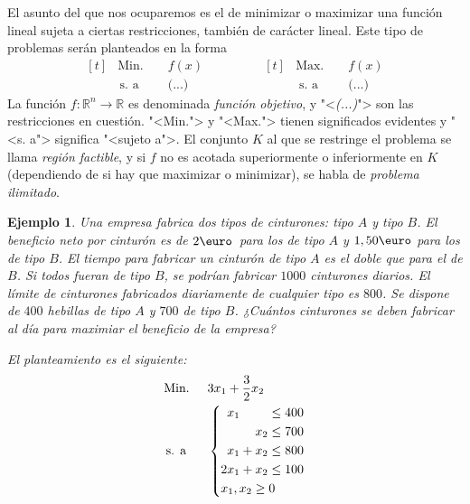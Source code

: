 \documentclass[11pt]{report}
\theoremstyle{mytheorem}
\theoremstyle{mydefinition}
\theoremstyle{myexample}
\newtheorem*{example}{Ejemplo}
\newcommand{\R}{\mathbb R}
\begin{document}
El asunto del que nos ocuparemos es el de minimizar o maximizar una función lineal sujeta a ciertas restricciones, también de carácter lineal. Este tipo de problemas serán planteados en la forma
\[
\begin{aligned}[t]
&\text{Min. } &&f(x) \\
& \, \text{s. a} &&\textit{(...)}
\end{aligned} \qquad \qquad 
\begin{aligned}[t]
&\text{Max. } &&f(x) \\
& \; \text{s. a} &&\textit{(...)}
\end{aligned}
\]
La función $f \colon \R^n \to \R$ es denominada {\textit{función objetivo}}, y "<\textit{(...)}"> son las restricciones en cuestión. "<Min."> y "<Max."> tienen significados evidentes y "<s. a"> significa "<sujeto a">. El conjunto $K$ al que se restringe el problema se llama {\textit{región factible}}, y si $f$ no es acotada superiormente o inferiormente en $K$ (dependiendo de si hay que maximizar o minimizar), se habla de {\textit{problema ilimitado}}.

\begin{example} \textit{Una empresa fabrica dos tipos de cinturones: tipo $A$ y tipo $B$. El beneficio neto por cinturón es de $2 \textup{\euro}$\ para los de tipo $A$ y $1,50 \textup{\euro}$ para los de tipo $B$. El tiempo para fabricar un cinturón de tipo $A$ es el doble que para el de $B$. Si todos fueran de tipo $B$, se podrían fabricar $1000$ cinturones diarios. El límite de cinturones fabricados diariamente de cualquier tipo es $800$. Se dispone de $400$ hebillas de tipo $A$ y $700$ de tipo $B$. ¿Cuántos cinturones se deben fabricar al día para maximiar el beneficio de la empresa?}

El planteamiento es el siguiente:
\[\begin{aligned}[t]
&\text{Min. } && 3x_1+\frac{3}{2}x_2 \\
& \, \text{s. a} &&
\left\{ \begin{alignedat}{6}
&  &x_1 &       &     & {}\leq{} & 400 \\
&  &    &       & x_2 & {}\leq{} & 700 \\
&  &x_1 & {}+{} & x_2 & {}\leq{} & 800 \\
& 2&x_1 & {}+{} & x_2 & {}\leq{} & 100 \\
& \mathrlap{x_1, x_2 \geq 0} & & & & &
\end{alignedat} \right.
\end{aligned}
\]
\end{example}
\end{document}
